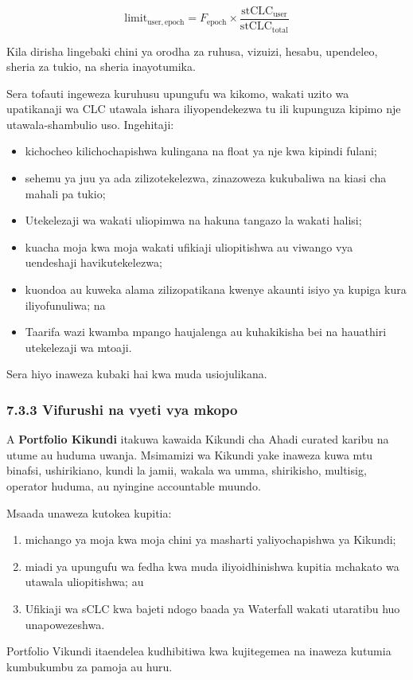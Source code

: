 \documentclass[11pt]{article}
\begin{document}
\[
\mathrm{limit}_{\mathrm{user,epoch}} = F_{\mathrm{epoch}} \times \frac{\mathrm{stCLC}_{\mathrm{user}}}{\mathrm{stCLC}_{\mathrm{total}}}
\]

Kila dirisha lingebaki chini ya orodha za ruhusa, vizuizi, hesabu, upendeleo, sheria za tukio, na sheria inayotumika.

Sera tofauti ingeweza kuruhusu upungufu wa kikomo, wakati uzito wa upatikanaji wa CLC utawala ishara iliyopendekezwa tu ili kupunguza kipimo nje utawala-shambulio uso. Ingehitaji:

\begin{itemize}[leftmargin=*]
\item kichocheo kilichochapishwa kulingana na float ya nje kwa kipindi fulani;
\item sehemu ya juu ya ada zilizotekelezwa, zinazoweza kukubaliwa na kiasi cha mahali pa tukio;
\item Utekelezaji wa wakati uliopimwa na hakuna tangazo la wakati halisi;
\item kuacha moja kwa moja wakati ufikiaji uliopitishwa au viwango vya uendeshaji havikutekelezwa;
\item kuondoa au kuweka alama zilizopatikana kwenye akaunti isiyo ya kupiga kura iliyofunuliwa; na
\item Taarifa wazi kwamba mpango haujalenga au kuhakikisha bei na hauathiri utekelezaji wa mtoaji.
\end{itemize}
Sera hiyo inaweza kubaki hai kwa muda usiojulikana.

\subsubsection*{7.3.3 Vifurushi na vyeti vya mkopo}

A \textbf{Portfolio Kikundi} itakuwa kawaida Kikundi cha Ahadi curated karibu na utume au huduma uwanja. Msimamizi wa Kikundi yake inaweza kuwa mtu binafsi, ushirikiano, kundi la jamii, wakala wa umma, shirikisho, multisig, operator huduma, au nyingine accountable muundo.

Msaada unaweza kutokea kupitia:

\begin{enumerate}[leftmargin=*]
\item michango ya moja kwa moja chini ya masharti yaliyochapishwa ya Kikundi;
\item miadi ya upungufu wa fedha kwa muda iliyoidhinishwa kupitia mchakato wa utawala uliopitishwa; au
\item Ufikiaji wa sCLC kwa bajeti ndogo baada ya Waterfall wakati utaratibu huo unapowezeshwa.
\end{enumerate}
Portfolio Vikundi itaendelea kudhibitiwa kwa kujitegemea na inaweza kutumia kumbukumbu za pamoja au huru.
\end{document}
